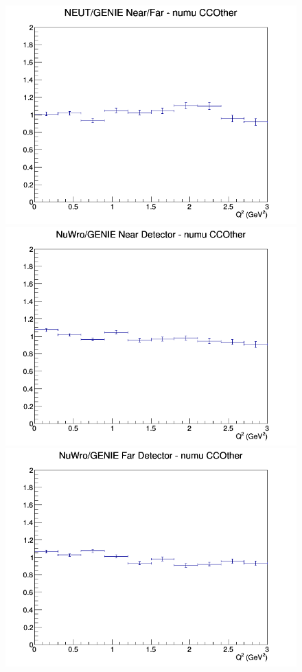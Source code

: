 \begin{figure}[h]
\endminipage
{}
\includegraphics[width=\linewidth]{eff_Q2/GAr/ratios/CCOther_NEUT_GENIE_numu_NF_Q2.png}
\endminipage
\newline
{}
\includegraphics[width=\linewidth]{eff_Q2/GAr/ratios/CCOther_NuWro_GENIE_numu_near_Q2.png}
\endminipage
{}
\includegraphics[width=\linewidth]{eff_Q2/GAr/ratios/CCOther_NuWro_GENIE_numu_far_Q2.png}

\end{figure}
